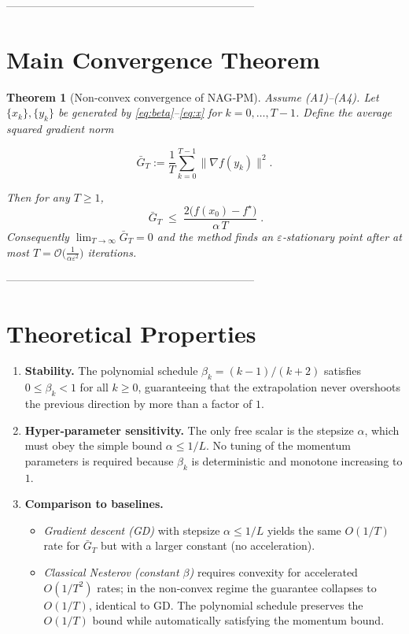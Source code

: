 \documentclass[11pt]{article}
\newtheorem{theorem}{Theorem}
\begin{document}
--------------------------------------------------------------------

\section*{Main Convergence Theorem}
\begin{theorem}[Non‑convex convergence of NAG‑PM]\label{thm:main}
Assume (A1)–(A4). Let $\{x_k\},\{y_k\}$ be generated by \eqref{eq:beta}–\eqref{eq:x}
for $k=0,\dots,T-1$. Define the average squared gradient norm  

\[
\bar{G}_T:=\frac{1}{T}\sum_{k=0}^{T-1}\|\nabla f(y_k)\|^{2}.
\]

Then for any $T\ge 1$,
\[
\boxed{\;
\bar{G}_T\;\le\;\frac{2\bigl(f(x_0)-f^\star\bigr)}{\alpha\,T}\; }.
\tag{T1}
\]
Consequently $\displaystyle\lim_{T\to\infty}\bar{G}_T=0$ and the method finds an
$\varepsilon$‑stationary point after at most 
$T= \mathcal{O}\!\bigl(\frac{1}{\alpha\varepsilon^{2}}\bigr)$ iterations.
\end{theorem}

--------------------------------------------------------------------

\section*{Theoretical Properties}
\begin{enumerate}
\item \textbf{Stability.} The polynomial schedule $\beta_k=(k-1)/(k+2)$ satisfies $0\le\beta_k<1$ for all $k\ge0$, guaranteeing that the extrapolation never overshoots the previous direction by more than a factor of $1$.
\item \textbf{Hyper‑parameter sensitivity.} The only free scalar is the stepsize $\alpha$, which must obey the simple bound $\alpha\le1/L$. No tuning of the momentum parameters is required because $\beta_k$ is deterministic and monotone increasing to $1$.
\item \textbf{Comparison to baselines.}
    \begin{itemize}
        \item \emph{Gradient descent (GD)} with stepsize $\alpha\le1/L$ yields the same $O(1/T)$ rate for $\bar G_T$ but with a larger constant (no acceleration).  
        \item \emph{Classical Nesterov (constant $\beta$)} requires convexity for accelerated $O(1/T^{2})$ rates; in the non‑convex regime the guarantee collapses to $O(1/T)$, identical to GD.  The polynomial schedule preserves the $O(1/T)$ bound while automatically satisfying the momentum bound.
    \end{itemize}
\end{enumerate}
\end{document}
